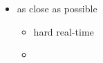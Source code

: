 \label{princ}

\begin{itemize}
    \item as close as possible
    \begin{itemize}
        \item hard real-time
        \item 
    \end{itemize}
\end{itemize}
